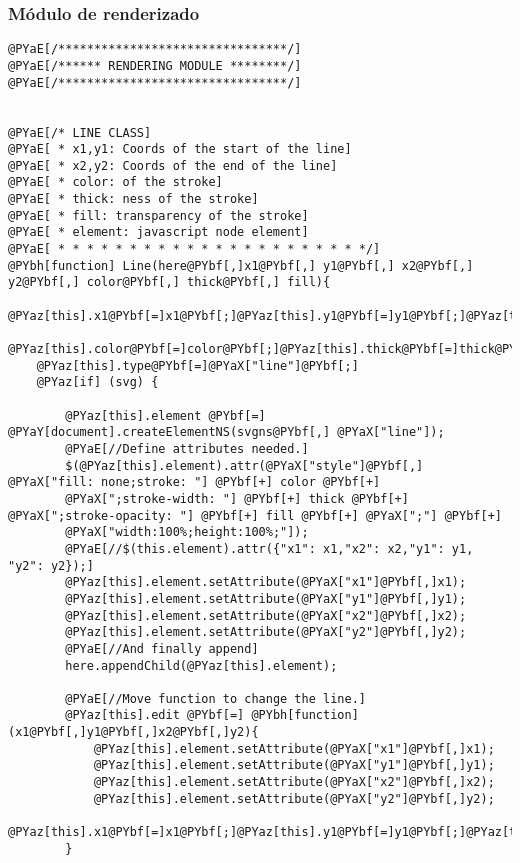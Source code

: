 
\subsubsection{Módulo de renderizado} %
\label{ssub:módulo_de_renderizado}

\begin{Verbatim}[commandchars=@\[\]]
@PYaE[/********************************/]
@PYaE[/****** RENDERING MODULE ********/]
@PYaE[/********************************/]


@PYaE[/* LINE CLASS]
@PYaE[ * x1,y1: Coords of the start of the line]
@PYaE[ * x2,y2: Coords of the end of the line]
@PYaE[ * color: of the stroke]
@PYaE[ * thick: ness of the stroke]
@PYaE[ * fill: transparency of the stroke]
@PYaE[ * element: javascript node element]
@PYaE[ * * * * * * * * * * * * * * * * * * * * * */]
@PYbh[function] Line(here@PYbf[,]x1@PYbf[,] y1@PYbf[,] x2@PYbf[,] y2@PYbf[,] color@PYbf[,] thick@PYbf[,] fill){
	@PYaz[this].x1@PYbf[=]x1@PYbf[;]@PYaz[this].y1@PYbf[=]y1@PYbf[;]@PYaz[this].x2@PYbf[=]x2@PYbf[;]@PYaz[this].y2@PYbf[=]y2@PYbf[;]
	@PYaz[this].color@PYbf[=]color@PYbf[;]@PYaz[this].thick@PYbf[=]thick@PYbf[;]@PYaz[this].fill@PYbf[=]fill@PYbf[;]
	@PYaz[this].type@PYbf[=]@PYaX["line"]@PYbf[;]
    @PYaz[if] (svg) {
        
		@PYaz[this].element @PYbf[=] @PYaY[document].createElementNS(svgns@PYbf[,] @PYaX["line"]);
		@PYaE[//Define attributes needed.]
        $(@PYaz[this].element).attr(@PYaX["style"]@PYbf[,] @PYaX["fill: none;stroke: "] @PYbf[+] color @PYbf[+]
        @PYaX[";stroke-width: "] @PYbf[+] thick @PYbf[+] @PYaX[";stroke-opacity: "] @PYbf[+] fill @PYbf[+] @PYaX[";"] @PYbf[+] 
		@PYaX["width:100%;height:100%;"]);
        @PYaE[//$(this.element).attr({"x1": x1,"x2": x2,"y1": y1, "y2": y2});]
		@PYaz[this].element.setAttribute(@PYaX["x1"]@PYbf[,]x1);
		@PYaz[this].element.setAttribute(@PYaX["y1"]@PYbf[,]y1);
		@PYaz[this].element.setAttribute(@PYaX["x2"]@PYbf[,]x2);
		@PYaz[this].element.setAttribute(@PYaX["y2"]@PYbf[,]y2);
		@PYaE[//And finally append]
		here.appendChild(@PYaz[this].element);
		
		@PYaE[//Move function to change the line.]
		@PYaz[this].edit @PYbf[=] @PYbh[function](x1@PYbf[,]y1@PYbf[,]x2@PYbf[,]y2){
			@PYaz[this].element.setAttribute(@PYaX["x1"]@PYbf[,]x1);
			@PYaz[this].element.setAttribute(@PYaX["y1"]@PYbf[,]y1);
			@PYaz[this].element.setAttribute(@PYaX["x2"]@PYbf[,]x2);
			@PYaz[this].element.setAttribute(@PYaX["y2"]@PYbf[,]y2);
			@PYaz[this].x1@PYbf[=]x1@PYbf[;]@PYaz[this].y1@PYbf[=]y1@PYbf[;]@PYaz[this].x2@PYbf[=]x2@PYbf[;]@PYaz[this].y2@PYbf[=]y2@PYbf[;]
		}
		

\end{Verbatim}
